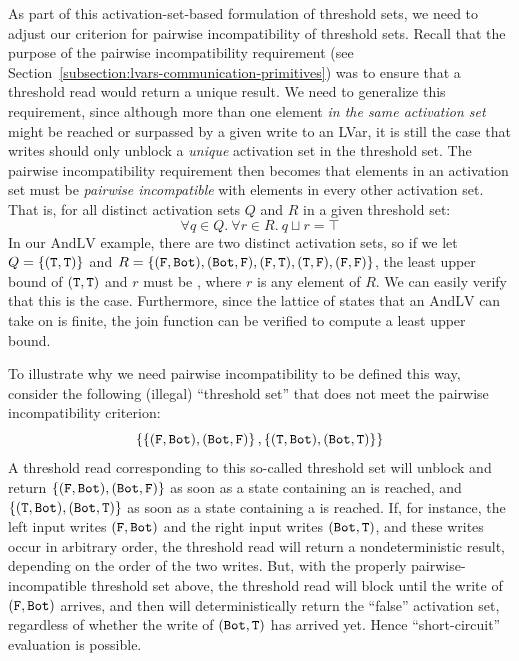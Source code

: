 As part of this activation-set-based formulation of threshold sets, we
need to adjust our criterion for pairwise incompatibility of threshold
sets.  Recall that the purpose of the pairwise incompatibility
requirement (see
Section~\ref{subsection:lvars-communication-primitives}) was to ensure
that a threshold read would return a unique result.  We need to
generalize this requirement, since although more than one element
\emph{in the same activation set} might be reached or surpassed by a
given write to an LVar, it is still the case that writes should only
unblock a \emph{unique} activation set in the threshold set.  The
pairwise incompatibility requirement then becomes that elements in an
activation set must be \emph{pairwise incompatible} with elements in
every other activation set.  That is, for all distinct activation sets
$Q$ and $R$ in a given threshold set:
\[
\forall q \in Q.~\forall r \in R.~q \sqcup r = \top
\]
In our $\mathrm{AndLV}$ example, there are two distinct activation
sets, so if we let $Q = \left\{ (\texttt{T},\texttt{T}) \right\}$ and $R = \left\{
  (\texttt{F},\texttt{Bot}), (\texttt{Bot},\texttt{F}), (\texttt{F},\texttt{T}), (\texttt{T},\texttt{F}),
  (\texttt{F},\texttt{F}) \right\}$, the least upper bound of $(\texttt{T},\texttt{T})$ and $r$
must be , where $r$ is any element of $R$.  We can easily
verify that this is the case.  Furthermore, since the lattice of
states that an $\mathrm{AndLV}$ can take on is finite, the join
function can be verified to compute a least upper bound.

To illustrate why we need pairwise incompatibility to be defined this
way, consider the following (illegal) ``threshold set'' that does not
meet the pairwise incompatibility criterion:
\[
\left\{
\left\{ (\texttt{F},\texttt{Bot}), (\texttt{Bot},\texttt{F}) \right\},
\left\{ (\texttt{T},\texttt{Bot}), (\texttt{Bot},\texttt{T}) \right\}
\right\}
\]
A threshold read corresponding to this so-called threshold set will
unblock and return $\left\{ (\texttt{F},\texttt{Bot}), (\texttt{Bot},\texttt{F}) \right\}$ as soon
as a state containing an  is reached, and $\left\{
  (\texttt{T},\texttt{Bot}), (\texttt{Bot},\texttt{T}) \right\}$ as soon as a state containing a
 is reached.  If, for instance, the left input writes
$(\texttt{F},\texttt{Bot})$ and the right input writes $(\texttt{Bot},\texttt{T})$, and
these writes occur in arbitrary order, the threshold read will return
a nondeterministic result, depending on the order of the two writes.
But, with the properly pairwise-incompatible threshold set above, the
threshold read will block until the write of $(\texttt{F},\texttt{Bot})$ arrives,
and then will deterministically return the ``false'' activation set,
regardless of whether the write of $(\texttt{Bot},\texttt{T})$ has arrived yet.
Hence ``short-circuit'' evaluation is possible.

